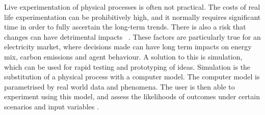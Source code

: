 Live experimentation of physical processes is often not practical. The costs of real life experimentation can be prohibitively high, and it normally requires significant time in order to fully ascertain the long-term trends. There is also a risk that changes can have detrimental impacts ~\cite{Forshaw2016}. These factors are particularly true for an electricity market, where decisions made can have long term impacts on energy mix, carbon emissions and agent behaviour.  A solution to this is simulation, which can be used for rapid testing and prototyping of ideas. Simulation is the substitution of a physical process with a computer model. The computer model is parametrised by real world data and phenomena. The user is then able to experiment using this model, and assess the likelihoods of outcomes under certain scenarios and input variables \cite{Law:603360}.

